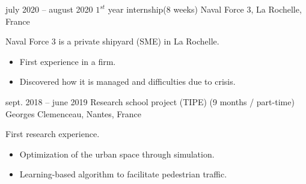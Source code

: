 \documentclass[
	a4paper,
]{fortysecondscv}
\begin{document}
\newpage
\makebacksidebar
{}
\begin{cvtable}[2]
	\cvitem
    	{july 2020 -- august 2020}
    	{$1^{st}$ year internship\newline (8 weeks)}
    	{Naval Force 3, La Rochelle, France}
    	{
	        Naval Force 3 is a private shipyard (SME) in La Rochelle.
    	    \begin{itemize}
            	\item First experience in a firm.
            	\item Discovered how it is managed and difficulties due to crisis.
    	    \end{itemize}
        	 \newline
        	 
    	}
	\cvitem
    	{sept. 2018 -- june 2019}
    	{Research school project (TIPE) \newline (9 months / part-time)}
    	{Georges Clemenceau, Nantes, France}
    	 {
            First research experience.
    	    \begin{itemize}
            	\item Optimization of the urban space through simulation.
            	\item Learning-based algorithm to facilitate pedestrian traffic.
    	    \end{itemize}
        	 \newline
        	 
    	}
\end{cvtable}
\end{document}
